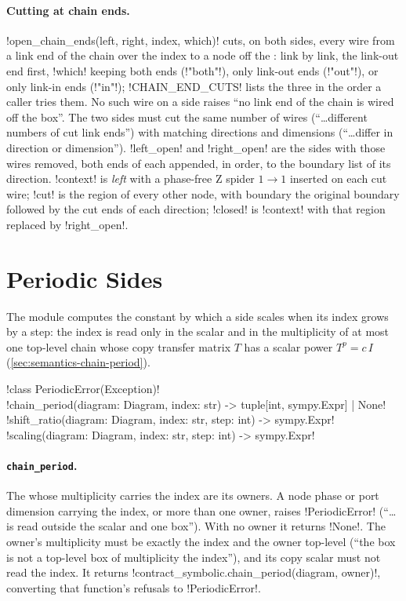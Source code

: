 \paragraph{Cutting at chain ends.} \py!open_chain_ends(left, right, index, which)! cuts, on both sides, every wire from a link end of the chain over the index to a node off the \bbox{}: link by link, the link-out end first, \py!which! keeping both ends (\code!"both"!), only link-out ends (\code!"out"!), or only link-in ends (\code!"in"!); \py!CHAIN_END_CUTS! lists the three in the order a caller tries them. No such wire on a side raises ``no link end of the chain is wired off the box''. The two sides must cut the same number of wires (``\ldots different numbers of cut link ends'') with matching directions and dimensions (``\ldots differ in direction or dimension''). \code!left_open! and \code!right_open! are the sides with those wires removed, both ends of each appended, in order, to the boundary list of its direction. \code!context! is \textit{left} with a phase-free Z spider $1\to1$ inserted on each cut wire; \code!cut! is the region of every other node, with boundary the original boundary followed by the cut ends of each direction; \code!closed! is \code!context! with that region replaced by \code!right_open!.

\section{Periodic Sides}\label{sec:semantics-periodic}

The module  computes the constant by which a side scales when its index grows by a step: the index is read only in the scalar and in the multiplicity of at most one top-level chain \bbox{} whose copy transfer matrix $T$ has a scalar power $T^p=c\,I$ (\cref{sec:semantics-chain-period}).

\begin{signature}
\py!class PeriodicError(Exception)!\\
\py!chain_period(diagram: Diagram, index: str) -> tuple[int, sympy.Expr] | None!\\
\py!shift_ratio(diagram: Diagram, index: str, step: int) -> sympy.Expr!\\
\py!scaling(diagram: Diagram, index: str, step: int) -> sympy.Expr!
\end{signature}

\paragraph{\texttt{chain\_period}.} The \bboxes{} whose multiplicity carries the index are its owners. A node phase or port dimension carrying the index, or more than one owner, raises \py!PeriodicError! (``\ldots is read outside the scalar and one box''). With no owner it returns \py!None!. The owner's multiplicity must be exactly the index and the owner top-level (``the box is not a top-level box of multiplicity the index''), and its copy scalar must not read the index. It returns \py!contract_symbolic.chain_period(diagram, owner)!, converting that function's refusals to \py!PeriodicError!.

